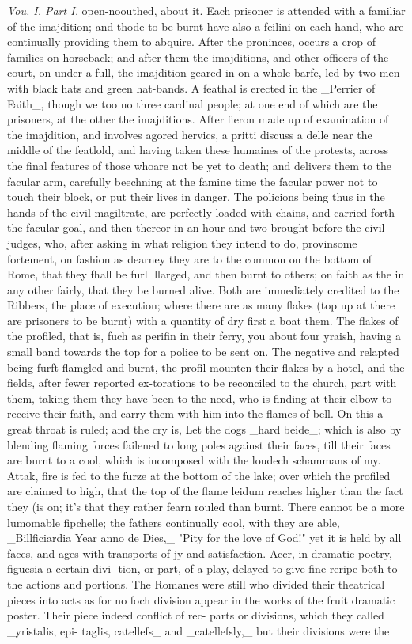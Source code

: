 \documentclass{article}
\begin{document}
\textit{Vou. I. Part I.}
open-noouthed, about it. Each prisoner is attended with a familiar of the imajdition; and thode to be burnt have also a feilini on each hand, who are continually providing them to abquire. After the proninces, occurs a crop of families on horseback; and after them the imajditions, and other officers of the court, on under a full, the imajdition geared in on a whole barfe, led by two men with black hats and green hat-bands. A feathal is erected in the \_Perrier of Faith\_, though we too no three cardinal people; at one end of which are the prisoners, at the other the imajditions. After fieron made up of examination of the imajdition, and involves agored hervics, a pritti discuss a delle near the middle of the featlold, and having taken these humaines of the protests, across the final features of those whoare not be yet to death; and delivers them to the facular arm, carefully beechning at the famine time the facular power not to touch their block, or put their lives in danger. The policions being thus in the hands of the civil magiltrate, are perfectly loaded with chains, and carried forth the facular goal, and then thereor in an hour and two brought before the civil judges, who, after asking in what religion they intend to do, provinsome fortement, on fashion as dearney they are to the common on the bottom of Rome, that they fhall be furll llarged, and then burnt to others; on faith as the in any other fairly, that they be burned alive. Both are immediately credited to the Ribbers, the place of execution; where there are as many flakes (top up at there are prisoners to be burnt) with a quantity of dry first a boat them. The flakes of the profiled, that is, fuch as perifin in their ferry, you about four yraish, having a small band towards the top for a police to be sent on. The negative and relapted being furft flamgled and burnt, the profil mounten their flakes by a hotel, and the fields, after fewer reported ex-torations to be reconciled to the church, part with them, taking them they have been to the need, who is finding at their elbow to receive their faith, and carry them with him into the flames of bell. On this a great throat is ruled; and the cry is, Let the dogs \_hard beide\_; which is also by blending flaming forces failened to long poles against their faces, till their faces are burnt to a cool, which is incomposed with the loudech schammans of my. Attak, fire is fed to the furze at the bottom of the lake; over which the profiled are claimed to high, that the top of the flame leidum reaches higher than the fact they (is on; it’s that they rather fearn rouled than burnt. There cannot be a more lumomable fipchelle; the fathers continually cool, with they are able, \_Billficiardia Year anno de Dies,\_ "Pity for the love of God!" yet it is held by all faces, and ages with transports of jy and satisfaction. Accr, in dramatic poetry, figuesia a certain divi- tion, or part, of a play, delayed to give fine reripe both to the actions and portions. The Romanes were still who divided their theatrical pieces into acts as for no foch division appear in the works of the fruit dramatic poster. Their piece indeed conflict of rec- parts or divisions, which they called \_yristalis, epi- taglis, catellefs\_ and \_catellefsly,\_ but their divisions were the 
\end{document}
